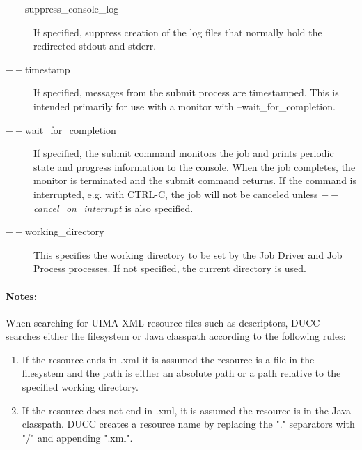 \begin{description}
           \item[$--$suppress\_console\_log] If specified, suppress creation of the log files that 
             normally hold the redirected stdout and stderr.

           \item[$--$timestamp ]
             If specified, messages from the submit process are timestamped. This is intended primarily 
             for use with a monitor with --wait\_for\_completion. 

           \item[$--$wait\_for\_completion ]             
             If specified, the submit command monitors the job and prints periodic
             state and progress information to the console.  When the job completes, the monitor
             is terminated and the submit command returns.  If the command is interrupted, e.g. with CTRL-C,
             the job will not be canceled unless {\em $--$cancel\_on\_interrupt} is also specified.
             
           \item[$--$working\_directory ]             
             This specifies the working directory to be set by the Job Driver and Job Process processes. 
             If not specified, the current directory is used.
  \end{description}
             
  \paragraph{Notes:}
  \label{par:cli.submit.notes}
  When searching for UIMA XML resource files such as descriptors, DUCC searches either the 
  filesystem or Java classpath according to the following rules:
  \begin{enumerate}
    \item If the resource ends in .xml it is assumed the resource is a file in the filesystem 
      and the path is either an absolute path or a path relative to the specified working directory.
    \item If the resource does not end in .xml, it is assumed the resource is in the Java
      classpath. DUCC creates a resource name by replacing the "." separators with "/" and appending ".xml".
  \end{enumerate}
